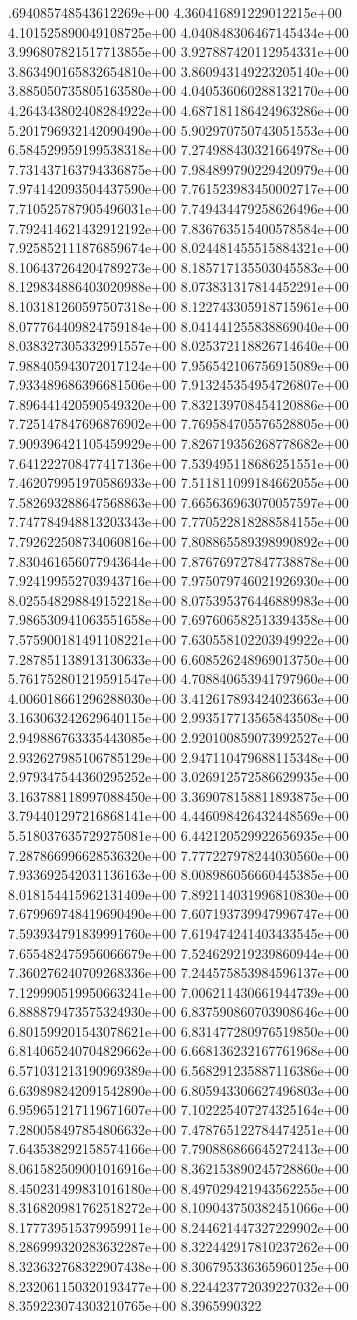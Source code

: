 .694085748543612269e+00	4.360416891229012215e+00	4.101525890049108725e+00	4.040848306467145434e+00	3.996807821517713855e+00	3.927887420112954331e+00	3.863490165832654810e+00	3.860943149223205140e+00	3.885050735805163580e+00	4.040536060288132170e+00	4.264343802408284922e+00	4.687181186424963286e+00	5.201796932142090490e+00	5.902970750743051553e+00	6.584529959199538318e+00	7.274988430321664978e+00	7.731437163794336875e+00	7.984899790229420979e+00	7.974142093504437590e+00	7.761523983450002717e+00	7.710525787905496031e+00	7.749434479258626496e+00	7.792414621432912192e+00	7.836763515400578584e+00	7.925852111876859674e+00	8.024481455515884321e+00	8.106437264204789273e+00	8.185717135503045583e+00	8.129834886403020988e+00	8.073831317814452291e+00	8.103181260597507318e+00	8.122743305918715961e+00	8.077764409824759184e+00	8.041441255838869040e+00	8.038327305332991557e+00	8.025372118826714640e+00	7.988405943072017124e+00	7.956542106756915089e+00	7.933489686396681506e+00	7.913245354954726807e+00	7.896441420590549320e+00	7.832139708454120886e+00	7.725147847696876902e+00	7.769584705576528805e+00	7.909396421105459929e+00	7.826719356268778682e+00	7.641222708477417136e+00	7.539495118686251551e+00	7.462079951970586933e+00	7.511811099184662055e+00	7.582693288647568863e+00	7.665636963070057597e+00	7.747784948813203343e+00	7.770522818288584155e+00	7.792622508734060816e+00	7.808865589398990892e+00	7.830461656077943644e+00	7.876769727847738878e+00	7.924199552703943716e+00	7.975079746021926930e+00	8.025548298849152218e+00	8.075395376446889983e+00	7.986530941063551658e+00	7.697606582513394358e+00	7.575900181491108221e+00	7.630558102203949922e+00	7.287851138913130633e+00	6.608526248969013750e+00	5.761752801219591547e+00	4.708840653941797960e+00	4.006018661296288030e+00	3.412617893424023663e+00	3.163063242629640115e+00	2.993517713565843508e+00	2.949886763335443085e+00	2.920100859073992527e+00	2.932627985106785129e+00	2.947110479688115348e+00	2.979347544360295252e+00	3.026912572586629935e+00	3.163788118997088450e+00	3.369078158811893875e+00	3.794401297216868141e+00	4.446098426432448569e+00	5.518037635729275081e+00	6.442120529922656935e+00	7.287866996628536320e+00	7.777227978244030560e+00	7.933692542031136163e+00	8.008986056660445385e+00	8.018154415962131409e+00	7.892114031996810830e+00	7.679969748419690490e+00	7.607193739947996747e+00	7.593934791839991760e+00	7.619474241403433545e+00	7.655482475956066679e+00	7.524629219239860944e+00	7.360276240709268336e+00	7.244575853984596137e+00	7.129990519950663241e+00	7.006211430661944739e+00	6.888879473575324930e+00	6.837590860703908646e+00	6.801599201543078621e+00	6.831477280976519850e+00	6.814065240704829662e+00	6.668136232167761968e+00	6.571031213190969389e+00	6.568291235887116386e+00	6.639898242091542890e+00	6.805943306627496803e+00	6.959651217119671607e+00	7.102225407274325164e+00	7.280058497854806632e+00	7.478765122784474251e+00	7.643538292158574166e+00	7.790886866645272413e+00	8.061582509001016916e+00	8.362153890245728860e+00	8.450231499831016180e+00	8.497029421943562255e+00	8.316820981762518272e+00	8.109043750382451066e+00	8.177739515379959911e+00	8.244621447327229902e+00	8.286999320283632287e+00	8.322442917810237262e+00	8.323632768322907438e+00	8.306795336365960125e+00	8.232061150320193477e+00	8.224423772039227032e+00	8.359223074303210765e+00	8.3965990322